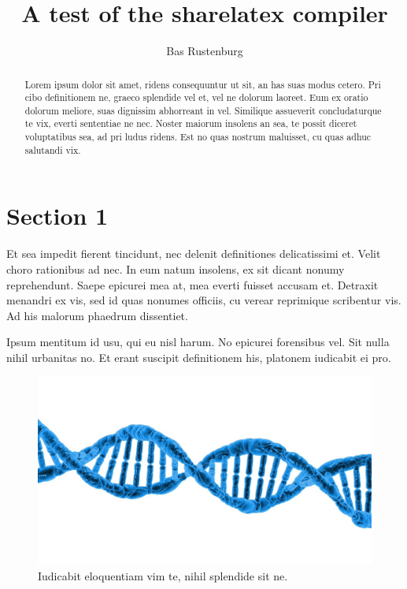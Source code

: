 \documentclass[a4paper,10pt]{article}
\title{A test of the sharelatex compiler}
\author{Bas Rustenburg}
\begin{document}
\maketitle

\begin{abstract}
Lorem ipsum dolor sit amet, ridens consequuntur ut sit, an has suas modus cetero.
Pri cibo definitionem ne, graeco splendide vel et, vel ne dolorum laoreet. \cite{rasbastenburg2014}
Eum ex oratio dolorum meliore, suas dignissim abhorreant in vel.
Similique assueverit concludaturque te vix, everti sententiae ne nec.
Noster maiorum insolens an sea, te possit diceret voluptatibus sea, ad pri ludus ridens.
Est no quas nostrum maluisset, cu quas adhuc salutandi vix.
\end{abstract}



\section{Section 1}
Et sea impedit fierent tincidunt, nec delenit definitiones delicatissimi et.
Velit choro rationibus ad nec.
In eum natum insolens, ex sit dicant nonumy reprehendunt.
Saepe epicurei mea at, mea everti fuisset accusam et.
Detraxit menandri ex vis, sed id quas nonumes officiis, cu verear reprimique scribentur vis.
Ad his malorum phaedrum dissentiet.

Ipsum mentitum id usu, qui eu nisl harum.
No epicurei forensibus vel.
Sit nulla nihil urbanitas no.
Et erant suscipit definitionem his, platonem iudicabit ei pro.

\begin{figure}[H]
 \centering
 \includegraphics[width=\textwidth,keepaspectratio=true]{./dna.jpg}
 \caption{Iudicabit eloquentiam vim te, nihil splendide sit ne.}
 \label{fig:dna}
\end{figure}
\end{document}
